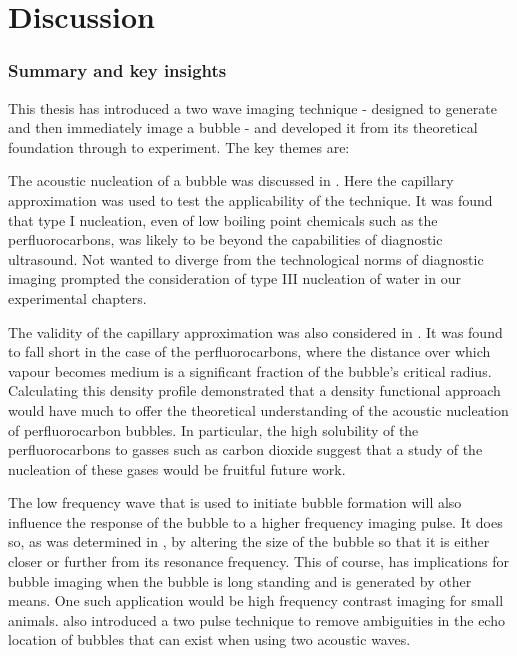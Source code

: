 

\chapter{Discussion}\label{ch:discussion}

\subsection{Summary and key insights}

This thesis has introduced a two wave imaging technique 
- designed to generate and then immediately image a bubble -
and developed it from its theoretical foundation through to experiment.
The key themes are:

The acoustic nucleation of a bubble was discussed in .
Here the capillary approximation was used to test the applicability of the technique.
It was found that type I nucleation, 
even of low boiling point chemicals such as the perfluorocarbons,
was likely to be beyond the capabilities of diagnostic ultrasound.
Not wanted to diverge from the technological norms of diagnostic imaging 
prompted the consideration of type III nucleation of water in our experimental chapters.

The validity of the capillary approximation was also considered in .
It was found to fall short in the case of the perfluorocarbons, 
where the distance over which vapour becomes medium is a significant fraction of the bubble's critical radius.
Calculating this density profile demonstrated that a density functional approach would have much to offer
the theoretical understanding of the acoustic nucleation of perfluorocarbon bubbles.
In particular, 
the high solubility of the perfluorocarbons to gasses such as carbon dioxide suggest that a 
study of the nucleation of these gases would be fruitful future work.


The low frequency wave that is used to initiate bubble formation will also influence the response of the bubble to a higher frequency imaging pulse.
It does so, 
as was determined in ,
by altering the size of the bubble so that it is either closer or further from its resonance frequency.
This of course, 
has implications for bubble imaging when the bubble is long standing and is generated by other means.
One such application would be high frequency contrast imaging for small animals.
 also introduced a two pulse technique to remove ambiguities
in the echo location of bubbles that can exist when using two acoustic waves.

